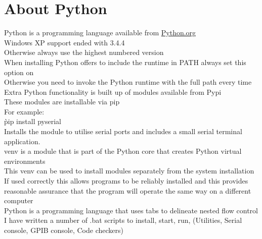 \section{About Python}
\label{sec:Python}
\gls{Python} is a programming language available from \href{https://python.org}{Python.org}\\
Windows XP support ended with 3.4.4\\
Otherwise always use the highest numbered version\\

When installing Python offers to include the runtime in PATH always set this option on\\
Otherwise you need to invoke the Python runtime with the full path every time\\

Extra Python functionality is built up of modules available from \gls{Pypi}\\
These modules are installable via \gls{pip}\\

For example:\\
\`pip install pyserial\`\\
Installs the module to utilise serial ports and includes a small serial terminal application.\\

\gls{venv} is a module that is part of the Python core that creates Python virtual environments\\
This venv can be used to install modules separately from the system installation\\
If used correctly this allows programs to be reliably installed and this provides reasonable assurance that the program will operate the same way on a different computer\\

Python is a programming language that uses tabs to delineate nested flow control\\

I have written a number of .bat scripts to install, start, run, (Utilities, Serial console, GPIB console, Code checkers)\\
